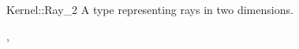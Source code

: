 \begin{ccRefConcept}{Kernel::Ray_2}
A type representing rays in two dimensions.

\ccRefines
{},

\ccSeeAlso
{}

\end{ccRefConcept}
